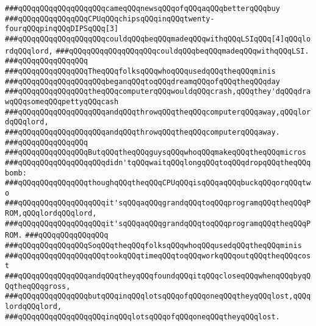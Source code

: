 \verb|###qQQqqQQqqQQqqQQqqQQqcameqQQqnewsqQQqofqQQqaqQQqbetterqQQqbuy|\newline
\verb|###qQQqqQQqqQQqqQQqCPUqQQqchipsqQQqinqQQqtwenty-fourqQQqpinqQQqDIPSqQQq[3]|\newline
\verb|###qQQqqQQqqQQqqQQqqQQqcouldqQQqbeqQQqmadeqQQqwithqQQqLSIqQQq[4]qQQqlordqQQqlord,|\newline
\verb|###qQQqqQQqqQQqqQQqqQQqcouldqQQqbeqQQqmadeqQQqwithqQQqLSI.|\newline
\verb|###qQQqqQQqqQQqqQQq|\newline
\verb|###qQQqqQQqqQQqqQQqTheqQQqfolksqQQqwhoqQQqusedqQQqtheqQQqminis|\newline
\verb|###qQQqqQQqqQQqqQQqqQQqbeganqQQqtoqQQqdreamqQQqofqQQqtheqQQqday|\newline
\verb|###qQQqqQQqqQQqqQQqtheqQQqcomputerqQQqwouldqQQqcrash,qQQqthey'dqQQqdrawqQQqsomeqQQqpettyqQQqcash|\newline
\verb|###qQQqqQQqqQQqqQQqqQQqandqQQqthrowqQQqtheqQQqcomputerqQQqaway,qQQqlordqQQqlord,|\newline
\verb|###qQQqqQQqqQQqqQQqqQQqandqQQqthrowqQQqtheqQQqcomputerqQQqaway.|\newline
\verb|###qQQqqQQqqQQqqQQq|\newline
\verb|###qQQqqQQqqQQqqQQqButqQQqtheqQQqguysqQQqwhoqQQqmakeqQQqtheqQQqmicros|\newline
\verb|###qQQqqQQqqQQqqQQqqQQqdidn'tqQQqwaitqQQqlongqQQqtoqQQqdropqQQqtheqQQqbomb:|\newline
\verb|###qQQqqQQqqQQqqQQqthoughqQQqtheqQQqCPUqQQqisqQQqaqQQqbuckqQQqorqQQqtwo|\newline
\verb|###qQQqqQQqqQQqqQQqqQQqit'sqQQqaqQQqgrandqQQqtoqQQqprogramqQQqtheqQQqPROM,qQQqlordqQQqlord,|\newline
\verb|###qQQqqQQqqQQqqQQqqQQqit'sqQQqaqQQqgrandqQQqtoqQQqprogramqQQqtheqQQqPROM.|\newline
\verb|###qQQqqQQqqQQqqQQq|\newline
\verb|###qQQqqQQqqQQqqQQqSoqQQqtheqQQqfolksqQQqwhoqQQqusedqQQqtheqQQqminis|\newline
\verb|###qQQqqQQqqQQqqQQqqQQqtookqQQqtimeqQQqtoqQQqworkqQQqoutqQQqtheqQQqcost|\newline
\verb|###qQQqqQQqqQQqqQQqandqQQqtheyqQQqfoundqQQqitqQQqcloseqQQqwhenqQQqbyqQQqtheqQQqgross,|\newline
\verb|###qQQqqQQqqQQqqQQqbutqQQqinqQQqlotsqQQqofqQQqoneqQQqtheyqQQqlost,qQQqlordqQQqlord,|\newline
\verb|###qQQqqQQqqQQqqQQqqQQqinqQQqlotsqQQqofqQQqoneqQQqtheyqQQqlost.|\newline
